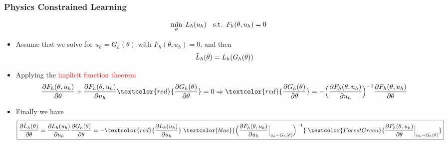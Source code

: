\documentclass[usenames,dvipsnames]{beamer}
\begin{document}
\begin{frame}
	\frametitle{Physics Constrained Learning}
	$${\small    \min_{\theta}\; L_h(u_h) \quad \mathrm{s.t.}\;\; F_h(\theta, u_h) = 0}$$
	\begin{itemize}
		\item Assume that we solve for $u_h=G_h(\theta)$ with $F_h(\theta, u_h)=0$, and then
		      $${\small\tilde L_h(\theta)  = L_h(G_h(\theta))}$$
		\item Applying the \textcolor{red}{implicit function theorem}
		      {  \scriptsize
			      \begin{equation*}
				      \frac{{\partial {F_h(\theta, u_h)}}}{{\partial \theta }} + {\frac{{\partial {F_h(\theta, u_h)}}}{{\partial {u_h}}}}
				      \textcolor{red}{\frac{\partial G_h(\theta)}{\partial \theta}}
				      = 0 \Rightarrow
				      \textcolor{red}{\frac{\partial G_h(\theta)}{\partial \theta}} =  -\Big( \frac{{\partial {F_h(\theta, u_h)}}}{{\partial {u_h}}} \Big)^{ - 1} \frac{{\partial {F_h(\theta, u_h)}}}{{\partial \theta }}
			      \end{equation*}
		      }
		\item Finally we have
			      {\scriptsize
				      \begin{equation*}
					      \boxed{\frac{{\partial {{\tilde L}_h}(\theta )}}{{\partial \theta }}
					      = \frac{\partial {{ L}_h}(u_h )}{\partial u_h}\frac{\partial G_h(\theta)}{\partial \theta}=
					      - \textcolor{red}{ \frac{{\partial {L_h}({u_h})}}{{\partial {u_h}}} } \;
					      \textcolor{blue}{ \Big( {\frac{{\partial {F_h(\theta, u_h)}}}{{\partial {u_h}}}\Big|_{u_h = {G_h}(\theta )}} \Big)^{ - 1} } \;
					      \textcolor{ForestGreen}{ \frac{{\partial {F_h(\theta, u_h)}}}{{\partial \theta }}\Big|_{u_h = {G_h}(\theta )} }
					      }
				      \end{equation*}
			      }

	\end{itemize}

\end{frame}
\end{document}
